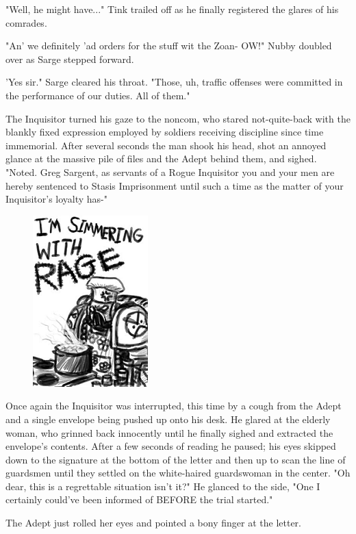 "Well, he might have..." Tink trailed off as he finally registered the glares of his comrades.

"An' we definitely 'ad orders for the stuff wit the Zoan- OW!" Nubby doubled over as Sarge stepped forward.

'Yes sir." Sarge cleared his throat. 
"Those, uh, traffic offenses were committed in the performance of our duties. 
All of them." 

The Inquisitor turned his gaze to the noncom, who stared not-quite-back with the blankly fixed expression employed by soldiers receiving discipline since time immemorial. 
After several seconds the man shook his head, shot an annoyed glance at the massive pile of files and the Adept behind them, and sighed. 
"Noted. 
Greg Sargent, as servants of a Rogue Inquisitor you and your men are hereby sentenced to Stasis Imprisonment until such a time as the matter of your Inquisitor's loyalty has-"

\begin{figure}
	\begin{center}
		\includegraphics[width=\figwidth]{pics/21/4.png}
	\end{center}
\end{figure}
Once again the Inquisitor was interrupted, this time by a cough from the Adept and a single envelope being pushed up onto his desk. 
He glared at the elderly woman, who grinned back innocently until he finally sighed and extracted the envelope's contents. 
After a few seconds of reading he paused; 
his eyes skipped down to the signature at the bottom of the letter and then up to scan the line of guardsmen until they settled on the white-haired guardswoman in the center. 
"Oh dear, this is a regrettable situation isn't it?" He glanced to the side, "One I certainly could've been informed of BEFORE the trial started."

The Adept just rolled her eyes and pointed a bony finger at the letter.

